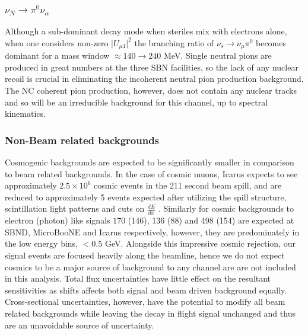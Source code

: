\documentclass[11pt, a4paper]{article}
\begin{document}
\subsubsection{$\nu_N \rightarrow \pi^0 \nu_\alpha$}
Although a sub-dominant decay mode when steriles mix with electrons alone, when one considers non-zero $\vert U_{\mu4}\vert^2$ the branching ratio of $\nu_s \rightarrow \nu_\mu \pi^0$ becomes dominant for a mass window $\approx 140 \rightarrow 240$ MeV. Single neutral pions are produced in great numbers at the three SBN facilities, so the lack of any nuclear recoil is crucial in eliminating the incoherent neutral pion production background. The NC coherent pion production, however, does not contain any nuclear tracks and so will be an irreducible background for this channel, up to spectral kinematics.

\subsubsection{Non-Beam related backgrounds}
Cosmogenic backgrounds are expected to be significantly smaller in comparison to beam related backgrounds. In the case of cosmic muons, Icarus expects to see approximately $2.5 \times 10^{6}$ cosmic events in the 211 second beam spill, and are reduced to approximately 5 events expected after utilizing the spill structure, scintillation light patterns and cuts on $\frac{d E}{d x}$ \cite{Antonello:2015lea}. Similarly for cosmic backgrounds to electron (photon) like signals 170 (146), 136 (88) and 498 (154) are expected at SBND, MicroBooNE and Icarus respectively, however, they are predominately in the low energy bins, $< 0.5$ GeV. Alongside this impressive cosmic rejection, our signal events are focused heavily along the beamline, hence we do not expect cosmics to be a major source of background to any channel are are not included in this analysis. Total flux uncertainties have little effect on the resultant sensitivities as shifts affects both signal and beam driven background equally. Cross-sectional uncertainties, however, have the potential to modify all beam related backgrounds while leaving the decay in flight signal unchanged and thus are an unavoidable source of uncertainty.
\end{document}
